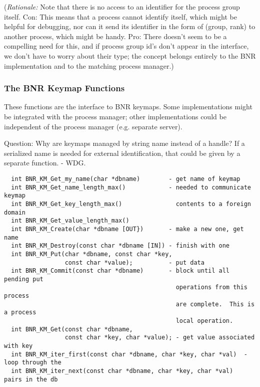 \documentclass{article}
\begin{document}
({\em Rationale:\/}  Note that there is no access to an identifier for the
process group itself.  Con:  This means that a process cannot identify itself,
which might be helpful for debugging, nor can it send its identifier in the
form of (group, rank) to another process, which might be handy.  Pro:  There
doesn't seem to be a compelling need for this, and if process group id's don't
appear in the interface, we don't have to worry about their type;  the concept
belongs entirely to the BNR implementation and to the matching process
manager.) 


\subsubsection{The BNR Keymap Functions}
\label{sec:bnr-keymap}

These functions are the interface to BNR keymaps.  Some implementations might
be integrated with the process manager; other implementations could be
independent of the process manager (e.g. separate server). 

Question: Why are keymaps managed by string name instead of a handle?
If a serialized name is needed for external identification, that could be 
given by a separate function.  - WDG.

\begin{small}
\begin{verbatim}
  int BNR_KM_Get_my_name(char *dbname)        - get name of keymap
  int BNR_KM_Get_name_length_max()            - needed to communicate keymap
  int BNR_KM_Get_key_length_max()               contents to a foreign domain
  int BNR_KM_Get_value_length_max()
  int BNR_KM_Create(char *dbname [OUT})       - make a new one, get name 
  int BNR_KM_Destroy(const char *dbname [IN]) - finish with one 
  int BNR_KM_Put(char *dbname, const char *key,
                 const char *value);          - put data
  int BNR_KM_Commit(const char *dbname)       - block until all pending put
                                                operations from this process
                                                are complete.  This is a process
                                                local operation.
  int BNR_KM_Get(const char *dbname,
                 const char *key, char *value); - get value associated with key
  int BNR_KM_iter_first(const char *dbname, char *key, char *val)  - loop through the
  int BNR_KM_iter_next(const char *dbname, char *key, char *val)      pairs in the db
\end{verbatim}
\end{small}
  
\end{document}
